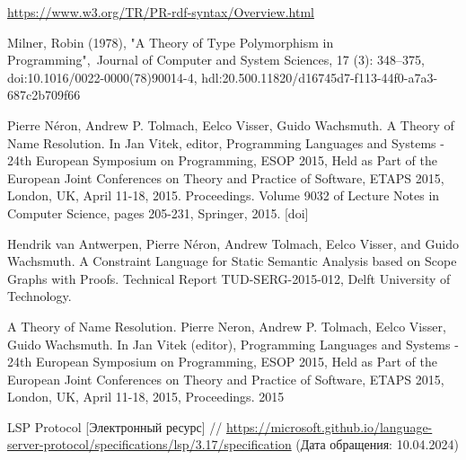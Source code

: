 \begin{thebibliography}{00}
    \url{https://www.w3.org/TR/PR-rdf-syntax/Overview.html}

    Milner, Robin (1978), "A Theory of Type Polymorphism in Programming",\
    Journal of Computer and System Sciences, 17 (3): 348–375,
    doi:10.1016/0022-0000(78)90014-4, hdl:20.500.11820/d16745d7-f113-44f0-a7a3-687c2b709f66

    Pierre Néron, Andrew P. Tolmach, Eelco Visser, Guido Wachsmuth.
    A Theory of Name Resolution. In Jan Vitek, editor, Programming Languages and Systems
    - 24th European Symposium on Programming, ESOP 2015, Held as Part of the European Joint Conferences 
    on Theory and Practice of Software, ETAPS 2015, London, UK, April 11-18, 2015. Proceedings. 
    Volume 9032 of Lecture Notes in Computer Science, pages 205-231, Springer, 2015. [doi]

    Hendrik van Antwerpen, Pierre Néron,
     Andrew Tolmach, Eelco Visser, and Guido Wachsmuth.
      A Constraint Language for Static Semantic Analysis based on Scope Graphs with Proofs.
       Technical Report TUD-SERG-2015-012, Delft University of Technology.
    
    A Theory of Name Resolution. Pierre Neron, Andrew P. Tolmach,
     Eelco Visser, Guido Wachsmuth. In Jan Vitek (editor),
      Programming Languages and Systems - 24th European Symposium on Programming,
       ESOP 2015, Held as Part of the European Joint Conferences on Theory and Practice of Software,
        ETAPS 2015, London, UK, April 11-18, 2015, Proceedings. 2015

    LSP Protocol [Электронный ресурс] //
    \url{https://microsoft.github.io/language-server-protocol/specifications/lsp/3.17/specification}
    (Дата обращения: 10.04.2024)

\end{thebibliography}
\endgroup

\clearpage
